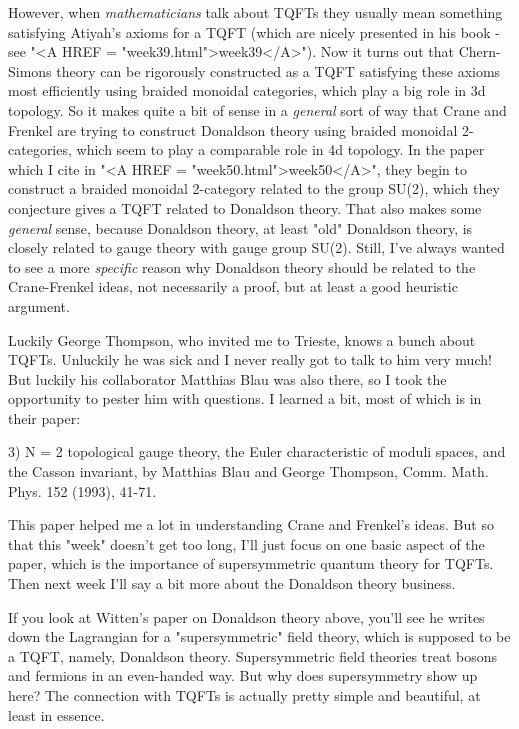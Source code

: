 However, when \emph{mathematicians} talk about TQFTs they usually
mean something satisfying Atiyah's axioms for a TQFT (which
are nicely presented in his book - see "<A HREF = "week39.html">week39</A>").  Now it
turns out that Chern-Simons theory can be rigorously constructed
as a TQFT satisfying these axioms most efficiently using
braided monoidal categories, which play a big role in 3d topology.
So it makes quite a bit of sense in a \emph{general} sort of way that
Crane and Frenkel are trying to construct Donaldson theory using 
braided monoidal 2-categories, which seem to play a comparable
role in 4d topology.  In the paper which I cite in "<A HREF = "week50.html">week50</A>", they begin 
to construct a braided monoidal 2-category related to the group SU(2), 
which they conjecture gives a TQFT related to Donaldson theory.  That
also makes some \emph{general} sense, because Donaldson theory, at
least "old" Donaldson theory, is closely related to gauge theory
with gauge group SU(2).  Still, I've always wanted to see a
more \emph{specific} reason why Donaldson theory should be related to 
the Crane-Frenkel ideas, not necessarily a proof, but at least
a good heuristic argument.  

Luckily George Thompson, who invited me to Trieste, knows a bunch
about TQFTs.  Unluckily he was sick and I never really got to talk
to him very much!  But luckily his collaborator Matthias Blau was
also there, so I took the opportunity to pester him with questions.
I learned a bit, most of which is in their paper:

3) N = 2 topological gauge theory, the Euler characteristic
of moduli spaces, and the Casson invariant, by Matthias Blau
and George Thompson, Comm. Math. Phys. 152 (1993), 41-71.

This paper helped me a lot in understanding Crane and Frenkel's 
ideas.  But so that this "week" doesn't get too long, I'll just 
focus on one basic aspect of the paper, which is the importance of 
supersymmetric quantum theory for TQFTs.  Then next week I'll say a
bit more about the Donaldson theory business.

If you look at Witten's paper on Donaldson theory above, you'll
see he writes down the Lagrangian for a "supersymmetric" field
theory, which is supposed to be a TQFT, namely, Donaldson theory.
Supersymmetric field theories treat bosons and fermions in an
even-handed way.  But why does supersymmetry show up here?
The connection with TQFTs is actually pretty simple
and beautiful, at least in essence.  

